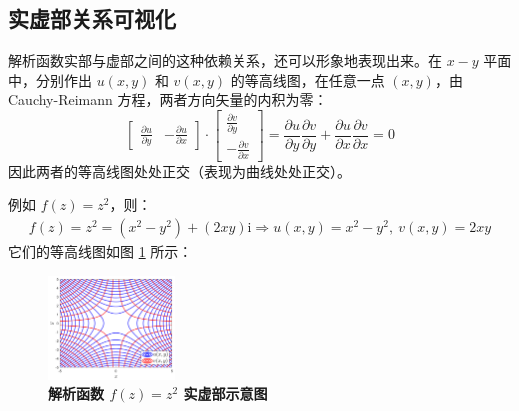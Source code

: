 \documentclass[UTF8]{report}
\theoremstyle{MyLineTheoremStyle} %
\theoremstyle{MyBlockTheoremStyle} %
\theoremstyle{MySubsubsectionStyle} %
\begin{document}
\subsection{实虚部关系可视化}
    解析函数实部与虚部之间的这种依赖关系，还可以形象地表现出来。在 $x-y$ 平面中，分别作出 $u(x,y)$ 和 $v(x,y)$ 的等高线图，在任意一点 $(x,y)$，由 Cauchy-Reimann 方程，两者方向矢量的内积为零：
    \begin{equation}
    \begin{bmatrix}
        \frac{\partial u }{\partial y } & - \frac{\partial u }{\partial x }
    \end{bmatrix}
    \cdot 
    \begin{bmatrix}
        \frac{\partial v }{\partial y } \\  -\frac{\partial v }{\partial x }
    \end{bmatrix}
    = \frac{\partial u }{\partial y }\frac{\partial v }{\partial y } + \frac{\partial u }{\partial x } \frac{\partial v }{\partial x } = 0
    \end{equation}
    因此两者的等高线图处处正交（表现为曲线处处正交）。
    
    {\par\color{gray}\small
    例如 $f(z) = z^2$，则：
    \begin{gather*}
        f(z) 
        = z^2
        = (x^2-y^2) + (2xy) \mathrm{i} 
        \Longrightarrow u(x,y) = x^2-y^2 ,\ v(x,y) = 2xy
    \end{gather*}
    它们的等高线图如图 \ref{解析函数 $f(z) = z^2$ 实虚部示意图} 所示：
    \begin{figure}[H]\centering
    \includegraphics[width=0.3\textwidth]{assets/2024-08-28_10-23-23.png}
    \caption{\textbf{解析函数 $f(z) = z^2$ 实虚部示意图}}\label{解析函数 $f(z) = z^2$ 实虚部示意图}
    \end{figure}
    \par}
    
\end{document}
